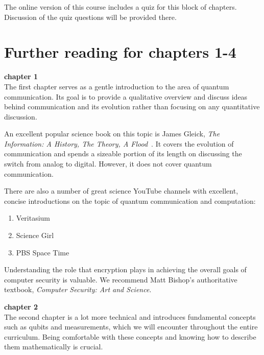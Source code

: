
The online version of this course includes a quiz for this block of chapters. Discussion of the quiz questions will be provided there.

\section*{Further reading for chapters 1-4}

{\bf chapter 1}\\

The first chapter serves as a gentle introduction to the area of quantum communication. Its goal is to provide a qualitative overview and discuss ideas behind communication and its evolution rather than focusing on any quantitative discussion.

An excellent popular science book on this topic is James Gleick, \emph{The Information: A History, The Theory, A Flood}~\cite{gleick2012information}. It covers the evolution of communication and spends a sizeable portion of its length on discussing the switch from analog to digital. However, it does not cover quantum communication.

There are also a number of great science YouTube channels with excellent, concise introductions on the topic of quantum communication and computation:
\begin{enumerate}
    \item Veritasium
    \item Science Girl
    \item PBS Space Time
\end{enumerate}

Understanding the role that encryption plays in achieving the overall goals of computer security is valuable. We recommend Matt Bishop's authoritative textbook, \emph{Computer Security: Art and Science}.

{\bf chapter 2}\\

The second chapter is a lot more technical and introduces fundamental concepts such as qubits and measurements, which we will encounter throughout the entire curriculum. Being comfortable with these concepts and knowing how to describe them mathematically is crucial.

